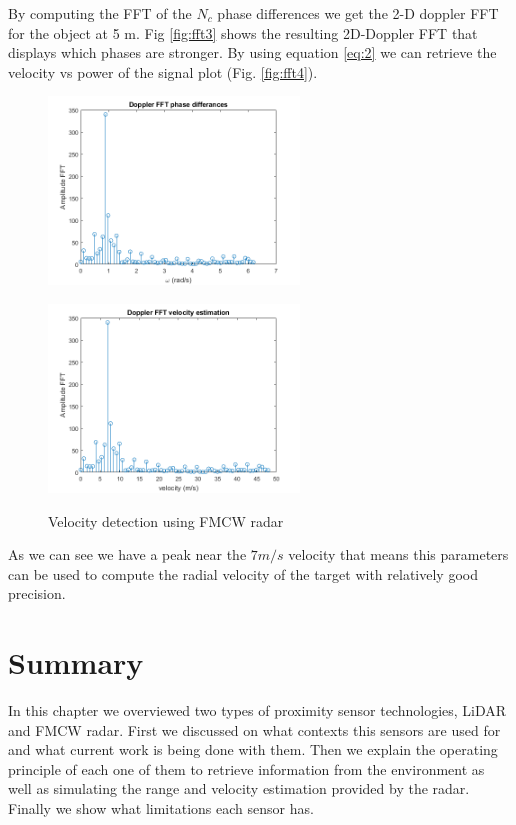 By computing the FFT of the $N_c$ phase differences we get the 2-D doppler \ac{FFT}  for the object at 5 m.  Fig \ref{fig:fft3} shows the resulting  2D-Doppler FFT that displays which phases are stronger. By using equation \ref{eq:2} we can retrieve the velocity vs power of the signal plot (Fig. \ref{fig:fft4}). 
\begin{figure}[ht] 
    \begin{minipage}[b]{.49\linewidth}
        \includegraphics[height=5cm,width=\linewidth]{imgs/chapter2/fft3.png}
        \label{fig:fft3}
    \end{minipage}
    \begin{minipage}[b]{.49\linewidth}
        \includegraphics[height=5cm,width=\linewidth]{imgs/chapter2/fft4.png}
        \label{fig:fft4}
    \end{minipage}
    \caption{Velocity detection using \ac{FMCW} \ac{radar}}
    \label{fig:velocitydetermination}
\end{figure}
As we can see we have a peak near the $7 m/s$ velocity that means this parameters can be used to compute the radial velocity of the target with relatively good precision. 


\section{Summary}
In this chapter we overviewed two types of proximity sensor technologies, \ac{LiDAR} and \ac{FMCW} radar. First we discussed on what contexts this sensors are used for and what current work is being done with them. Then we explain the operating principle of each one of them to retrieve information from the environment as well as simulating the range and velocity estimation provided by the radar.  Finally we show what limitations each sensor has.





